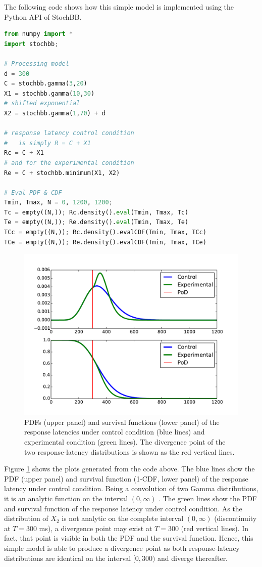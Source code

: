 The following code shows how this simple model is implemented using the Python API of StochBB.

\begin{lstlisting}[language=Python]
from numpy import *
import stochbb;

# Processing model
d = 300
C = stochbb.gamma(3,20)
X1 = stochbb.gamma(10,30)
# shifted exponential
X2 = stochbb.gamma(1,70) + d

# response latency control condition
#   is simply R = C + X1
Rc = C + X1
# and for the experimental condition
Re = C + stochbb.minimum(X1, X2)

# Eval PDF & CDF
Tmin, Tmax, N = 0, 1200, 1200;
Tc = empty((N,)); Rc.density().eval(Tmin, Tmax, Tc)
Te = empty((N,)); Re.density().eval(Tmin, Tmax, Te)
TCc = empty((N,)); Rc.density().evalCDF(Tmin, Tmax, TCc)
TCe = empty((N,)); Re.density().evalCDF(Tmin, Tmax, TCe)
\end{lstlisting}

\begin{figure} [!ht]
 \centering
 \includegraphics[width=.6\textwidth]{pod.pdf}
 \caption{PDFs (upper panel) and survival functions (lower panel) of the response latencies under 
 control condition (blue lines) and experimental condition (green lines).  The divergence point of 
 the two response-latency distributions is shown as the red vertical lines. \label{fig:pod}}
\end{figure}

Figure \ref{fig:pod} shows the plots generated from the code above. The blue lines show the PDF
(upper panel) and survival function (1-CDF, lower panel) of the response latency under control
condition. Being a convolution of two Gamma distributions, it is an analytic function on the
interval $(0,\infty)$ \citep{Gelooven1999}. The green lines show the PDF and survival function
of the response latency under control condition. As the distribution of $X_2$ is not analytic on the complete interval
$(0,\infty)$ (discontinuity at $T=300$ ms), a divergence point may exist at $T=300$ (red vertical
lines).  In fact, that point is visible in both the PDF and the survival function. Hence, this simple
model is able to produce a divergence point as both response-latency distributions are identical
on the interval $[0,300)$ and diverge thereafter.
